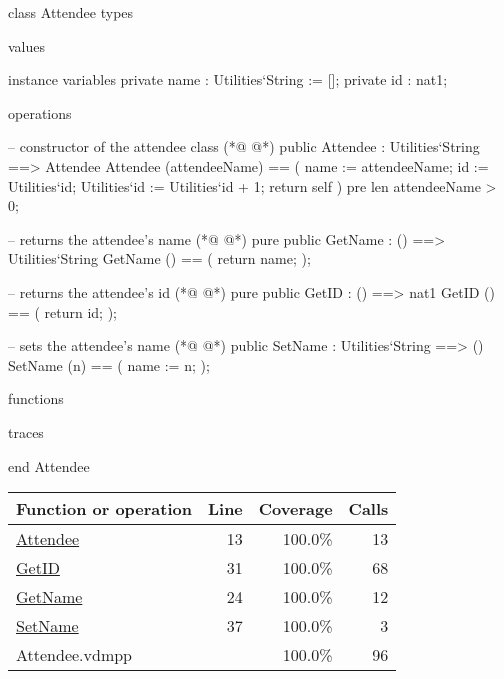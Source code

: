 \begin{vdmpp}[breaklines=true]
class Attendee
types

values

instance variables
 private name : Utilities`String := [];
 private id : nat1;

operations

 -- constructor of the attendee class 
(*@
\label{Attendee:13}
@*)
  public Attendee : Utilities`String ==> Attendee
    Attendee (attendeeName) == (
     name := attendeeName;
     id := Utilities`id;
     Utilities`id := Utilities`id + 1;
     return self
    )
    pre len attendeeName > 0;
    
    
  -- returns the attendee's name
(*@
\label{GetName:24}
@*)
   pure public GetName : () ==> Utilities`String
    GetName () == (
     return name;
    );
    
    
   -- returns the attendee's id
(*@
\label{GetID:31}
@*)
   pure public GetID : () ==> nat1
    GetID () == (
     return id;
    );
    
   -- sets the attendee's name
(*@
\label{SetName:37}
@*)
   public SetName : Utilities`String ==> ()
    SetName (n) == (
     name := n;
    );
   
functions

traces

end Attendee
\end{vdmpp}
\bigskip
\begin{longtable}{|l|r|r|r|}
\hline
Function or operation & Line & Coverage & Calls \\
\hline
\hline
\hyperref[Attendee:13]{Attendee} & 13&100.0\% & 13 \\
\hline
\hyperref[GetID:31]{GetID} & 31&100.0\% & 68 \\
\hline
\hyperref[GetName:24]{GetName} & 24&100.0\% & 12 \\
\hline
\hyperref[SetName:37]{SetName} & 37&100.0\% & 3 \\
\hline
\hline
Attendee.vdmpp & & 100.0\% & 96 \\
\hline
\end{longtable}

